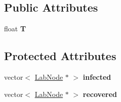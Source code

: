 \subsection*{Public Attributes}
\begin{DoxyCompactItemize}
\item 
\hypertarget{classstudy_1_1_percolation___sim_a3f6e447f078796382e7a12a7af801bc4}{float {\bfseries T}}\label{classstudy_1_1_percolation___sim_a3f6e447f078796382e7a12a7af801bc4}

\end{DoxyCompactItemize}
\subsection*{Protected Attributes}
\begin{DoxyCompactItemize}
\item 
\hypertarget{classstudy_1_1_percolation___sim_af1df83863bea9ee44df965836d1068bf}{vector$<$ \hyperlink{classelps_1_1_lab_node}{Lab\-Node} $\ast$ $>$ {\bfseries infected}}\label{classstudy_1_1_percolation___sim_af1df83863bea9ee44df965836d1068bf}

\item 
\hypertarget{classstudy_1_1_percolation___sim_a0c4b8745bb7581727438eb20597bba17}{vector$<$ \hyperlink{classelps_1_1_lab_node}{Lab\-Node} $\ast$ $>$ {\bfseries recovered}}\label{classstudy_1_1_percolation___sim_a0c4b8745bb7581727438eb20597bba17}

\end{DoxyCompactItemize}
